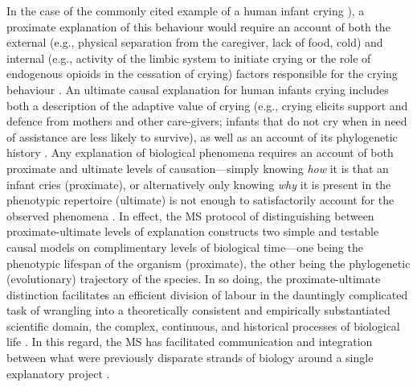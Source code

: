 In the case of the commonly cited example of a human infant crying \citep[taken from][]{Scott-Phillips2011,Nettle2009}), a proximate explanation of this behaviour would require an account of both the external (e.g., physical separation from the caregiver, lack of food, cold) and internal (e.g., activity of the limbic system to initiate crying or the role of endogenous opioids in the cessation of crying) factors responsible for the crying behaviour \citep[38]{Scott-Phillips2011}. An ultimate causal explanation for human infants crying includes both a description of the adaptive value of crying (e.g., crying elicits support and defence from mothers and other care-givers; infants that do not cry when in need of assistance are less likely to survive), as well as an account of its phylogenetic history \citep{Mayr1961,Tinbergen1963}.  Any explanation of biological phenomena requires an account of both proximate and ultimate levels of causation---simply knowing \textit{how} it is that an infant cries (proximate), or alternatively only knowing \textit{why} it is present in the phenotypic repertoire (ultimate) is not enough to satisfactorily account for the observed phenomena \citep[38]{Scott-Phillips2011}.  In effect, the MS protocol of distinguishing between proximate-ultimate levels of explanation constructs two simple and testable causal models on complimentary levels of biological time---one being the phenotypic lifespan of the organism (proximate), the other being the phylogenetic (evolutionary) trajectory of the species. In so doing, the proximate-ultimate distinction facilitates an efficient division of labour in the dauntingly complicated task of wrangling into a theoretically consistent and empirically substantiated scientific domain, the complex, continuous, and historical processes of biological life \citep{Mayr1961}. In this regard, the MS has facilitated communication and integration between what were previously disparate strands of biology around a single explanatory project \citep{Svensson2017}.


